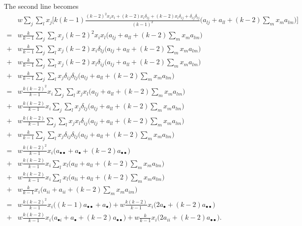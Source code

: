 \documentclass[14pt, a4paper, justified]{article}
\begin{document}
The second line becomes
\begin{equation}
    \begin{split}
        & w \sum_j \sum_l x_j \Big[ k(k-1) \frac{(k-2)^2 x_i x_l + (k-2) x_i \delta_{lj} + (k-2) x_l \delta_{ij} + \delta_{ij}\delta_{lj}}{(k-1)^2} \Big( a_{lj} + a_{ll} + (k-2) \sum_m x_m a_{lm} \Big) \Big]
        \\
        = & w \frac{k}{k-1} \sum_j \sum_l x_j (k-2)^2 x_i x_l \Big( a_{lj} + a_{ll} + (k-2) \sum_m x_m a_{lm} \Big)
        \\
        + & w \frac{k}{k-1} \sum_j \sum_l x_j (k-2) x_i \delta_{lj} \Big( a_{lj} + a_{ll} + (k-2) \sum_m x_m a_{lm} \Big)
        \\
        + & w \frac{k}{k-1} \sum_j \sum_l x_j (k-2) x_l \delta_{ij} \Big( a_{lj} + a_{ll} + (k-2) \sum_m x_m a_{lm} \Big)
        \\
        + & w \frac{k}{k-1} \sum_j \sum_l x_j \delta_{ij} \delta_{lj} \Big( a_{lj} + a_{ll} + (k-2) \sum_m x_m a_{lm} \Big)
        \\
        = & w \frac{k(k-2)^2}{k-1} x_i \sum_j \sum_l x_j x_l \Big( a_{lj} + a_{ll} + (k-2) \sum_m x_m a_{lm} \Big)
        \\
        + & w \frac{k(k-2)}{k-1} x_i \sum_j \sum_l x_j \delta_{lj} \Big( a_{lj} + a_{ll} + (k-2) \sum_m x_m a_{lm} \Big)
        \\
        + & w \frac{k(k-2)}{k-1} \sum_j \sum_l x_j x_l \delta_{ij} \Big( a_{lj} + a_{ll} + (k-2) \sum_m x_m a_{lm} \Big)
        \\
        + & w \frac{k}{k-1} \sum_j \sum_l x_j \delta_{ij} \delta_{lj} \Big( a_{lj} + a_{ll} + (k-2) \sum_m x_m a_{lm} \Big)
        \\
        = & w \frac{k(k-2)^2}{k-1} x_i \Big( a_{\bullet \bullet} + a_{\bullet} + (k-2) a_{\bullet \bullet} \Big)
        \\
        + & w \frac{k(k-2)}{k-1} x_i \sum_l x_l \Big( a_{ll} + a_{ll} + (k-2) \sum_m x_m a_{lm} \Big)
        \\
        + & w \frac{k(k-2)}{k-1} x_i \sum_l x_l \Big( a_{li} + a_{ll} + (k-2) \sum_m x_m a_{lm} \Big)
        \\
        + & w \frac{k}{k-1} x_i \Big( a_{ii} + a_{ii} + (k-2) \sum_m x_m a_{im} \Big)
        \\
        = & w \frac{k(k-2)^2}{k-1} x_i \Big( (k-1) a_{\bullet \bullet} + a_{\bullet} \Big) + w \frac{k(k-2)}{k-1} x_i \Big( 2a_{\bullet} + (k-2) a_{\bullet \bullet} \Big)
        \\
        + & w \frac{k(k-2)}{k-1} x_i \Big( a_{\bullet i} + a_{\bullet} + (k-2) a_{\bullet \bullet} \Big) + w \frac{k}{k-1} x_i \Big( 2 a_{ii} + (k-2) a_{\bullet \bullet} \Big).
    \end{split}
\end{equation}
\end{document}
